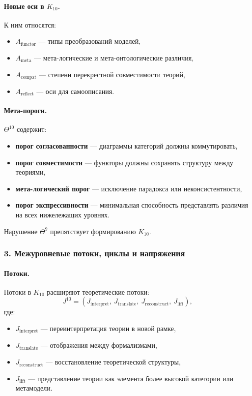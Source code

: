 \paragraph{Новые оси в \texorpdfstring{$K_{10}$}{K_{10}}.}
К ним относятся:
\begin{itemize}
  \item $A_{\mathrm{functor}}$ — типы преобразований моделей,
  \item $A_{\mathrm{meta}}$ — мета-логические и мета-онтологические различия,
  \item $A_{\mathrm{compat}}$ — степени перекрестной совместимости теорий,
  \item $A_{\mathrm{reflect}}$ — оси для самоописания.
\end{itemize}

\paragraph{Мета-пороги.}
$\Theta^{10}$ содержит:
\begin{itemize}
  \item \textbf{порог согласованности} — диаграммы категорий должны
        коммутировать,
  \item \textbf{порог совместимости} — функторы должны сохранять структуру между
        теориями,
  \item \textbf{мета-логический порог} — исключение парадокса или
        неконсистентности,
  \item \textbf{порог экспрессивности} — минимальная способность представлять
        различия на всех нижележащих уровнях.
\end{itemize}

Нарушение $\Theta^9$ препятствует формированию $K_{10}$.

\subsubsection{3. Межуровневые потоки, циклы и напряжения}

\paragraph{Потоки.}
Потоки в $K_{10}$ расширяют теоретические потоки:
\[
J^{10} = (J_{\mathrm{interpret}},\ J_{\mathrm{translate}},\
         J_{\mathrm{reconstruct}},\ J_{\mathrm{lift}}),
\]
где:
\begin{itemize}
  \item $J_{\mathrm{interpret}}$ — переинтерпретация теории в новой рамке,
  \item $J_{\mathrm{translate}}$ — отображения между формализмами,
  \item $J_{\mathrm{reconstruct}}$ — восстановление теоретической структуры,
  \item $J_{\mathrm{lift}}$ — представление теории как элемента более высокой
        категории или метамодели.
\end{itemize}

